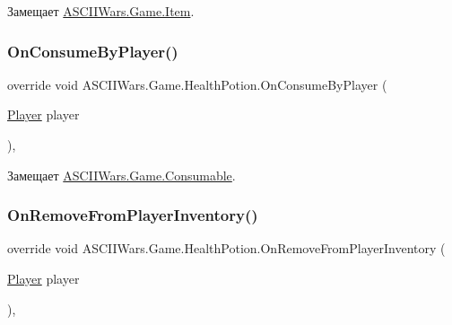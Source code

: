 Замещает \hyperlink{class_a_s_c_i_i_wars_1_1_game_1_1_item_aec0355b7a9f647ef24897b95563f70d1}{A\+S\+C\+I\+I\+Wars.\+Game.\+Item}.

\hypertarget{class_a_s_c_i_i_wars_1_1_game_1_1_health_potion_a3004d1c2396e9c068ed4e03884afd56c}{}\label{class_a_s_c_i_i_wars_1_1_game_1_1_health_potion_a3004d1c2396e9c068ed4e03884afd56c} 
\subsubsection{\texorpdfstring{On\+Consume\+By\+Player()}{OnConsumeByPlayer()}}
{\footnotesize\ttfamily override void A\+S\+C\+I\+I\+Wars.\+Game.\+Health\+Potion.\+On\+Consume\+By\+Player (\begin{DoxyParamCaption}\item[{\hyperlink{class_a_s_c_i_i_wars_1_1_game_1_1_player}{Player}}]{player }\end{DoxyParamCaption})\hspace{0.3cm}{\ttfamily [inline]}, {\ttfamily [virtual]}}



Замещает \hyperlink{class_a_s_c_i_i_wars_1_1_game_1_1_consumable_a6aac67fe076ca39cb850e3720461fff8}{A\+S\+C\+I\+I\+Wars.\+Game.\+Consumable}.

\hypertarget{class_a_s_c_i_i_wars_1_1_game_1_1_health_potion_ad708f58b7d3cbc69945cb2ccb0328f78}{}\label{class_a_s_c_i_i_wars_1_1_game_1_1_health_potion_ad708f58b7d3cbc69945cb2ccb0328f78} 
\subsubsection{\texorpdfstring{On\+Remove\+From\+Player\+Inventory()}{OnRemoveFromPlayerInventory()}}
{\footnotesize\ttfamily override void A\+S\+C\+I\+I\+Wars.\+Game.\+Health\+Potion.\+On\+Remove\+From\+Player\+Inventory (\begin{DoxyParamCaption}\item[{\hyperlink{class_a_s_c_i_i_wars_1_1_game_1_1_player}{Player}}]{player }\end{DoxyParamCaption})\hspace{0.3cm}{\ttfamily [inline]}, {\ttfamily [virtual]}}



